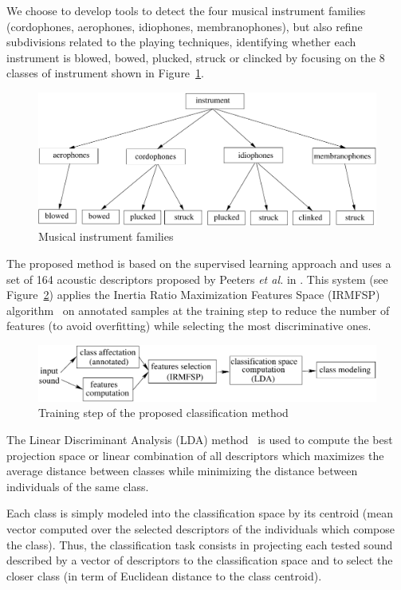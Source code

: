 \documentclass{sig-alternate}
\begin{document}
We choose to develop tools to detect the four musical instrument families (cordophones, aerophones, idiophones, membranophones), but also refine subdivisions related to the playing techniques, identifying whether each instrument is blowed, bowed, plucked, struck or clincked by focusing on the 8 classes of instrument shown in Figure~\ref{fig:instruments}.

\begin{figure}[htb]
  \centering
  \includegraphics[width=0.9\linewidth]{img/taxonomie_diadems.pdf}
  \caption{Musical instrument families}
  \label{fig:instruments}
\end{figure}

The proposed method is based on the supervised learning approach and uses a set of 164 acoustic descriptors 
proposed by Peeters \textit{et al.} in \cite{timbre_toolbox}.
This system (see Figure~\ref{fig:inst_classif_method}) applies the Inertia Ratio Maximization Features Space (IRMFSP) algorithm~\cite{aes_irmfsp} 
on annotated samples at the training step to reduce the number of features (to avoid overfitting) while selecting the most discriminative ones. %

\begin{figure}[htb]
 \centering
 \includegraphics[width=0.9\linewidth]{img/method}
 \caption{Training step of the proposed classification method}
 \label{fig:inst_classif_method}
\end{figure}

The Linear Discriminant Analysis (LDA) method~\cite{lda_book} is used to compute the best projection space 
or linear combination of all descriptors which maximizes the average distance between classes while minimizing the 
distance between individuals of the same class.

Each class is simply modeled into the classification space by its centroid (mean vector computed over the selected descriptors of the individuals which compose the class).
Thus, the classification task consists in projecting each tested sound described by a vector of descriptors
to the classification space and to select the closer class (in term of Euclidean distance to the class centroid). 
\end{document}
